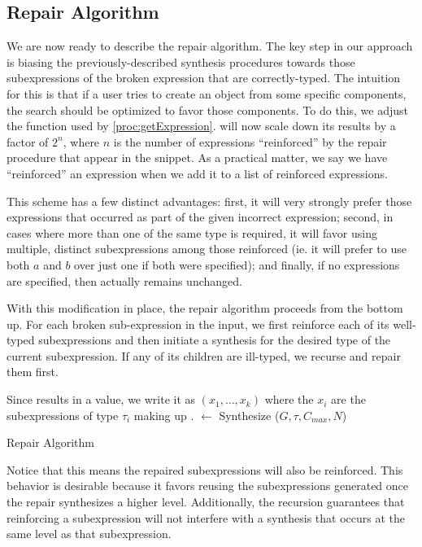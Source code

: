 \subsection{Repair Algorithm}
\label{sec:algorithm:repair}
We are now ready to describe the repair algorithm. The key step in our approach is biasing the previously-described synthesis procedures towards those subexpressions of the broken expression that are correctly-typed. The intuition for this is that if a user tries to create an object from some specific components, the search should be optimized to favor those components. To do this, we adjust the \Cost function used by \ref{proc:getExpression}. \Cost will now scale down its results by a factor of $2^n$, where $n$ is the number of expressions ``reinforced'' by the repair procedure that appear in the snippet. As a practical matter, we say we have ``reinforced'' an expression when we add it to a list of reinforced expressions.

This scheme has a few distinct advantages: first, it will very strongly prefer those expressions that occurred as part of the given incorrect expression; second, in cases where more than one of the same type is required, it will favor using multiple, distinct subexpressions among those reinforced (ie. it will prefer to use both $a$ and $b$ over just one if both were specified); and finally, if no expressions are specified, then \Cost actually remains unchanged.

With this modification in place, the repair algorithm proceeds from the bottom up. For each broken sub-expression in the input, we first reinforce each of its well-typed subexpressions and then initiate a synthesis for the desired type of the current subexpression. If any of its children are ill-typed, we recurse and repair them first.
\begin{algorithm}
\Output{\Repairs}
\BlankLine
{}
Since \Expr results in a value, we write it as \Expr$(x_1, \ldots, x_k)$ where the $x_i$ are the subexpressions of type $\tau_i$ making up \Expr.
\Repairs $\longleftarrow$ Synthesize ($G, \tau, C_{max}, N$)
\caption{Repair Algorithm}\label{proc:repair}
\end{algorithm}
Notice that this means the repaired subexpressions will also be reinforced. This behavior is desirable because it favors reusing the subexpressions generated once the repair synthesizes a higher level. Additionally, the recursion guarantees that reinforcing a subexpression will not interfere with a synthesis that occurs at the same level as that subexpression.

